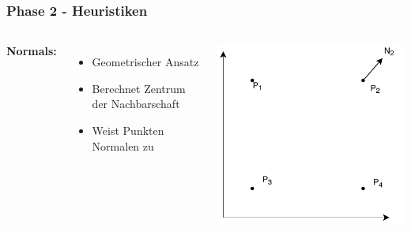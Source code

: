 \documentclass[aspectratio=169]{beamer}
\begin{document}
\begin{frame}
	\frametitle{Phase 2 - Heuristiken}
	\begin{columns}[c] %
		
		\textbf{Normals:}
		\begin{itemize}
			\item Geometrischer Ansatz
			\item Berechnet Zentrum der Nachbarschaft
			\item Weist Punkten Normalen zu
			
		\end{itemize}
		
		\includegraphics[scale=.7]{normals_normal.pdf}
		
		
		
	\end{columns}
	\end{frame}
	
\end{document}

